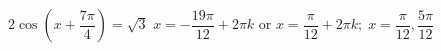 { $2\cos \left( x + \dfrac{7\pi}{4} \right) = \sqrt{3}$}
{ $x = -\dfrac{19\pi}{12} + 2\pi k$ or $x = \dfrac{\pi}{12} + 2\pi k; \; x = \dfrac{\pi}{12}, \dfrac{5\pi}{12}$}
